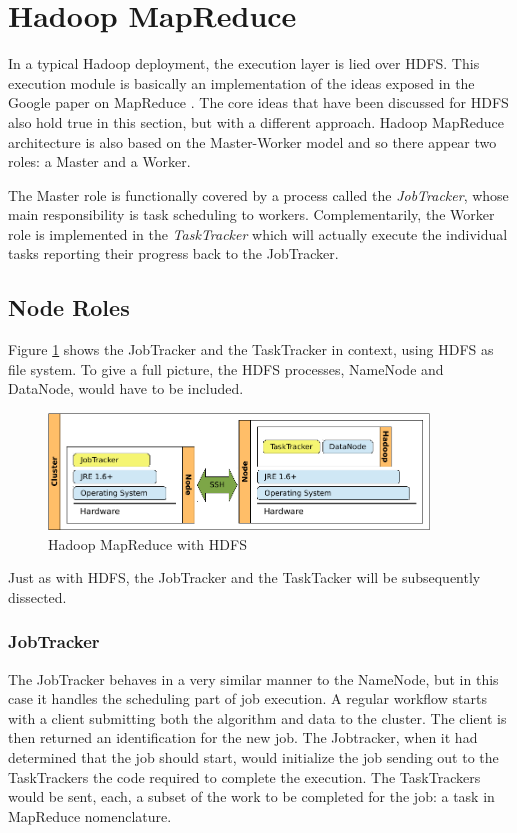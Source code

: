 \section{Hadoop MapReduce}\label{sec:hadoopmapred}
\noindent In a typical Hadoop deployment, the execution layer is lied over HDFS. This execution module is basically an implementation of the ideas exposed in the Google paper on MapReduce \cite{googlemapreduce}. The core ideas that have been discussed for HDFS also hold true in this section, but with a different approach. Hadoop MapReduce architecture is also based on the Master-Worker model and so there appear two roles: a Master and a Worker.

The Master role is functionally covered by a process called the \emph{JobTracker}, whose main responsibility is task scheduling to workers. Complementarily, the Worker role is implemented in the \emph{TaskTracker} which will actually execute the individual tasks reporting their progress back to the JobTracker.

\subsection{Node Roles}\label{subsec:rolesnodosmapred}
\noindent Figure \ref{fig:desplieguehadoopmapred} shows the JobTracker and the TaskTracker in context, using HDFS as file system. To give a full picture, the HDFS processes, NameNode and DataNode, would have to be included.

\begin{figure}[tbp]
\begin{center}
\includegraphics[width=0.9\textwidth]{imagenes/020.pdf}
 \caption{Hadoop MapReduce with HDFS}
\label{fig:desplieguehadoopmapred}
\end{center}
\end{figure}

Just as with HDFS, the JobTracker and the TaskTacker will be subsequently dissected.

\subsubsection{JobTracker}\label{subsubsec:jobtracker}
\noindent The JobTracker behaves in a very similar manner to the NameNode, but in this case it handles the scheduling part of job execution. A regular workflow starts with a client submitting both the algorithm and data to the cluster. The client is then returned an identification for the new job. The Jobtracker, when it had determined that the job should start, would initialize the job sending out to the TaskTrackers the code required to complete the execution. The TaskTrackers would be sent, each, a subset of the work to be completed for the job: a task in MapReduce nomenclature.

